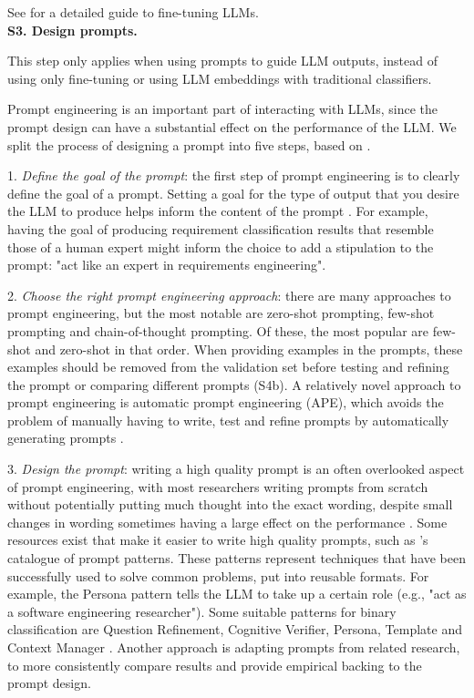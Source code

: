 \documentclass[a4paper]{article}
\newcommand{\infobox}[2]{
	\begin{tcolorbox}[
		skin=widget,
		boxrule=1mm,
		coltitle=black,
		colframe=darkishgray,
		colback=lightergray,
		width=(\linewidth),
		before=\hfill,
		after=\hfill,
		before skip=1pt,
		adjusted title={#1}
		]
		#2
	\end{tcolorbox}
}
\begin{document}
See \textcite{parthasarathy2024hyperUltimate} for a detailed guide to fine-tuning LLMs.\\


\textbf{S3. Design prompts.} \\ 
\infobox{Optional}{This step only applies when using prompts to guide LLM outputs, instead of using only fine-tuning or using LLM embeddings with traditional classifiers.}
Prompt engineering is an important part of interacting with LLMs, since the prompt design can have a substantial effect on the performance of the LLM. We split the process of designing a prompt into five steps, based on \textcite{Marvin2024}.

1. \textit{Define the goal of the prompt}: the first step of prompt engineering is to clearly define the goal of a prompt. Setting a goal for the type of output that you desire the LLM to produce helps inform the content of the prompt \cite{Marvin2024}. For example, having the goal of producing requirement classification results that resemble those of a human expert might inform the choice to add a stipulation to the prompt: "act like an expert in requirements engineering". 

2. \textit{Choose the right prompt engineering approach}: there are many approaches to prompt engineering, but the most notable are zero-shot prompting, few-shot prompting and chain-of-thought prompting. Of these, the most popular are few-shot and zero-shot in that order. When providing examples in the prompts, these examples should be removed from the validation set before testing and refining the prompt or comparing different prompts (S4b). A relatively novel approach to prompt engineering is automatic prompt engineering (APE), which avoids the problem of manually having to write, test and refine prompts by automatically generating prompts \cite{zhou2023ape,zadenoori2025}. 

3. \textit{Design the prompt}: writing a high quality prompt is an often overlooked aspect of prompt engineering, with most researchers writing prompts from scratch without potentially putting much thought into the exact wording, despite small changes in wording sometimes having a large effect on the performance \cite{sclar2024quantifyinglanguagemodelssensitivity}. Some resources exist that make it easier to write high quality prompts, such as \textcite{white2023}'s catalogue of prompt patterns. These patterns represent techniques that have been successfully used to solve common problems, put into reusable formats. For example, the Persona pattern tells the LLM to take up a certain role (e.g., "act as a software engineering researcher"). Some suitable patterns for binary classification are Question Refinement, Cognitive Verifier, Persona, Template and Context Manager \cite{ronanki2023}. Another approach is adapting prompts from related research, to more consistently compare results and provide empirical backing to the prompt design. 
\end{document}
